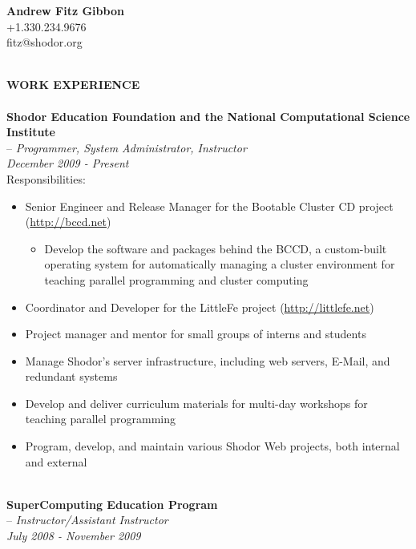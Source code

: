 \documentclass[10pt]{article}
\begin{document}
\begin{center}
\textbf{Andrew Fitz Gibbon}~\\
+1.330.234.9676~\\
fitz@shodor.org~\\
\end{center}
~\\
\textbf{WORK EXPERIENCE}~\\
~\\
\indent\textbf{Shodor Education Foundation and the National Computational Science Institute}~\\
\indent \indent -- \emph{Programmer, System Administrator, Instructor}~\\
\indent\textit{December 2009 - Present}~\\
\indent Responsibilities:
\begin{itemize}
  \addtolength{\itemsep}{-2mm}
		\item \indent Senior Engineer and Release Manager for the Bootable Cluster CD project (\url{http://bccd.net})
		\vspace{-2mm}
		\begin{itemize}
			\addtolength{\itemsep}{-2mm}
			\item Develop the software and packages behind the BCCD, a custom-built operating system for automatically managing a cluster environment for teaching parallel programming and cluster computing
		\end{itemize}
		\vspace{-2mm}
    \item \indent Coordinator and Developer for the LittleFe project (\url{http://littlefe.net})
		\item \indent Project manager and mentor for small groups of interns and students
		\item \indent Manage Shodor's server infrastructure, including web servers, E-Mail, and redundant systems
		\item \indent Develop and deliver curriculum materials for multi-day workshops for teaching parallel programming
		\item \indent Program, develop, and maintain various Shodor Web projects, both internal and external
\end{itemize}
~\\
\indent\textbf{SuperComputing Education Program}~\\
\indent \indent -- \emph{Instructor/Assistant Instructor}~\\
\indent\textit{July 2008 - November 2009}~\\
\end{document}
